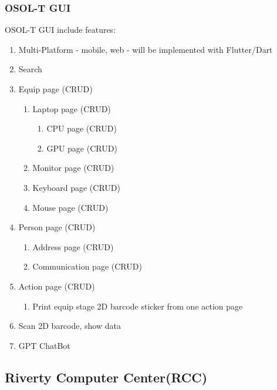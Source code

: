 \documentclass[a4paper,11pt]{article}
\begin{document}
\subsubsection{OSOL-T GUI}
OSOL-T GUI include features:
\begin{enumerate}
	\item Multi-Platform - mobile, web - will be implemented with Flutter/Dart
	\item Search
	\item Equip page (CRUD)
	\begin{enumerate}
		\item Laptop page (CRUD)
		\begin{enumerate}
			\item CPU page (CRUD)
			\item GPU page (CRUD)
		\end{enumerate}
		\item Monitor page (CRUD)
		\item Keyboard page (CRUD)
		\item Mouse page (CRUD)
	\end{enumerate}
	\item Person page (CRUD)
	\begin{enumerate}
		\item Address page (CRUD)
		\item Communication page (CRUD) 
	\end{enumerate}
	\item Action page (CRUD)
	\begin{enumerate}
		\item Print equip stage 2D barcode sticker from one action page
	\end{enumerate}
	\item Scan 2D barcode, show data
	\item GPT ChatBot
\end{enumerate}



\subsection{Riverty Computer Center(RCC)}
\end{document}
